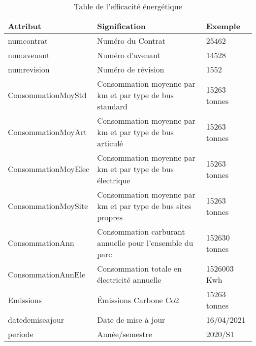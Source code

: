 	\begin{table}[H]
		\begin{center}
			\begin{tabularx}{17.5cm}{|p{4cm}|X|p{3cm}|}
				\hline
				\textbf{Attribut}   & \textbf{Signification}                                       & \textbf{Exemple} \\
				\hline
				numcontrat          & Numéro du Contrat                                            & 25462            \\
				\hline
				numavenant          & Numéro d'avenant                                             & 14528            \\
				\hline
				numrevision         & Numéro de révision                                           & 1552             \\
				\hline
				ConsommationMoyStd  & Consommation moyenne par km et par type de bus standard      & 15263 tonnes     \\
				\hline
				ConsommationMoyArt  & Consommation moyenne par km et par type de bus articulé      & 15263 tonnes     \\
				\hline
				ConsommationMoyElec & Consommation moyenne par km et par type de bus électrique    & 15263 tonnes     \\
				\hline
				ConsommationMoySite & Consommation moyenne par km et par type de bus sites propres & 15263 tonnes     \\
				\hline
				ConsommationAnn     & Consommation carburant annuelle pour l'ensemble du parc      & 152630 tonnes    \\
				\hline
				ConsommationAnnEle  & Consommation totale en électricité annuelle                  & 1526003 Kwh      \\
				\hline
				Emissions           & Émissions Carbone  Co2                                       & 15263 tonnes     \\
				\hline
				datedemiseajour     & Date de mise à jour                                          & 16/04/2021       \\
				\hline
				periode             & Année/semestre                                               & 2020/S1          \\
				\hline
			\end{tabularx}
			\caption{Table de l’efficacité énergétique}
		\end{center}
	\end{table}

